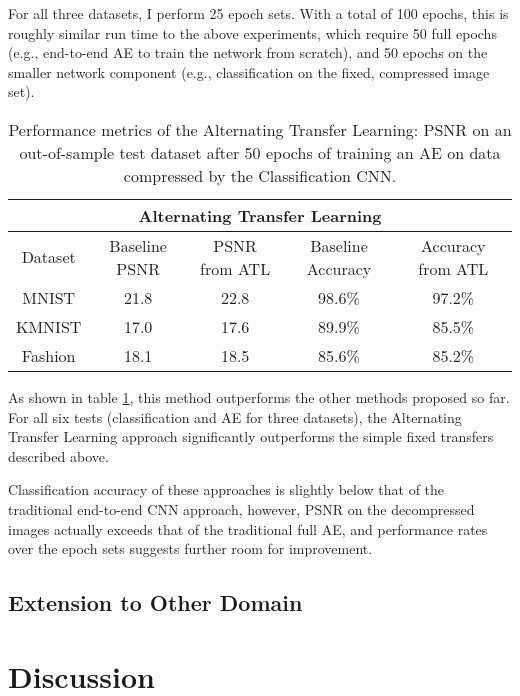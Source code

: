 \documentclass[twoside,11pt]{article}
\begin{document}
For all three datasets, I perform 25 epoch sets. With a total of 100 epochs, this is roughly
similar run time to the above experiments, which require 50 full epochs (e.g., end-to-end AE
to train the network from scratch), and 50 epochs on the smaller network component 
(e.g., classification on the fixed, compressed image set).


\begin{table}[h]
  \centering
  \begin{tabular}{|c||c|c|c|c|}
    \hline
    \multicolumn{5}{|c|}{Alternating Transfer Learning}\\
    \hline
    Dataset & Baseline PSNR  & PSNR from ATL & Baseline Accuracy & Accuracy from ATL \\   \hline
    MNIST & 21.8 & 22.8 & 98.6\% & 97.2\% \\   \hline
    KMNIST & 17.0 & 17.6 & 89.9\% & 85.5\% \\   \hline
    Fashion & 18.1 & 18.5 & 85.6\% & 85.2\% \\   \hline  

  \end{tabular}
  \caption{Performance metrics of the Alternating Transfer Learning:
   PSNR on an out-of-sample test dataset after 50 epochs of training an AE on
   data compressed by the Classification CNN.}
  \label{table:alternate}
\end{table}

As shown in table \ref{table:alternate}, this method outperforms the other methods proposed so far.
For all six tests (classification and AE for three datasets), the Alternating Transfer Learning 
approach significantly outperforms the simple fixed transfers described above. 

Classification accuracy of these approaches is slightly below that of the traditional 
end-to-end CNN approach, however, PSNR on the decompressed images actually exceeds that
of the traditional full AE, and performance rates over the epoch sets suggests further room
for improvement. 

\subsection{Extension to Other Domain}






\section{Discussion}
\end{document}
